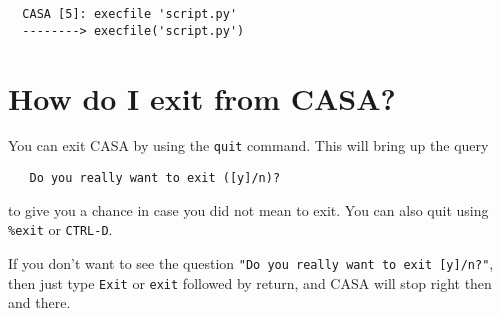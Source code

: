 \small
\begin{verbatim}
  CASA [5]: execfile 'script.py'
  --------> execfile('script.py')
\end{verbatim}
\normalsize

\section{How do I exit from CASA?}
\label{section:python.exit}

You can exit CASA by using the {\tt quit} command.  This will bring up the
query
\small
\begin{verbatim}
   Do you really want to exit ([y]/n)?
\end{verbatim}
\normalsize
to give you a chance in case you did not mean to exit.  You can
also quit using {\tt \%exit} or {\tt CTRL-D}.

If you don't want to see the question {\tt "Do you really want to exit
[y]/n?"}, then just type {\tt Exit} or {\tt exit} followed by 
return, and CASA will stop right then and there.

